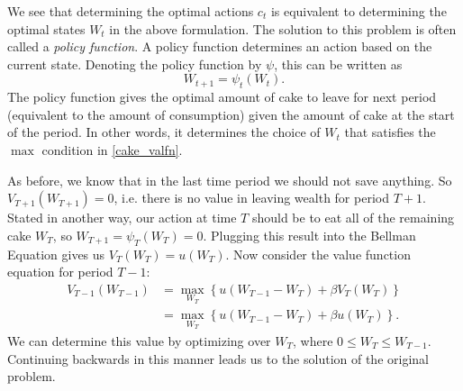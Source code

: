 We see that determining the optimal actions $c_t$ is equivalent to determining the optimal states $W_{t}$ in the
above formulation. The solution to this 
problem is often called a \emph{policy function}.  A policy function determines an action based on the current
state.  Denoting the policy function by $\psi$, this can be written as
\begin{equation*}
W_{t+1}=\psi_t \left(W_t\right).
\end{equation*}
The policy function gives the optimal amount of cake to leave for next period (equivalent to the amount of consumption) given
the amount of cake at the start of the period.  In other words, it determines the choice of $W_t$ that satisfies the $\max$
condition in \eqref{cake_valfn}.

As before, we know that in the last time period we should not save anything.  So $V_{T+1}(W_{T+1}) = 0$, i.e. there is 
no value in leaving wealth for period $T+1$. Stated in another way, our action at time $T$ should be to eat all of the 
remaining cake $W_T$, so $W_{T+1} = \psi_T(W_T) = 0$.
Plugging this result into the Bellman Equation gives us $V_T(W_T) = u(W_T)$.  
Now consider the value function equation for period $T-1$:
\begin{align*}
V_{T-1}(W_{T-1}) &= \max_{W_T} \left\{u(W_{T-1} - W_T) + \beta V_T(W_T)\right\} \\
                 &= \max_{W_T} \left\{u(W_{T-1} - W_T) + \beta u(W_T)\right\}.
\end{align*}
We can determine this value by optimizing over $W_T$, where $0 \leq W_T \leq W_{T-1}$.
Continuing backwards in this manner leads us to the solution of the original problem.

